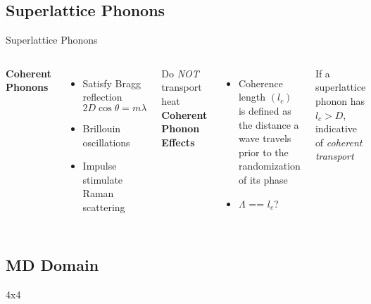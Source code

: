 \documentclass[xcolor=x11names,compress]{beamer}
\renewcommand{\(}{\begin{columns}}
\renewcommand{\)}{\end{columns}}
\newcommand{\<}[1]{\begin{column}{#1}}
\renewcommand{\>}{\end{column}}
\begin{document}
\subsection{Superlattice Phonons}
\begin{frame}{Superlattice Phonons}
\begin{columns}
\textbf{Coherent Phonons}
\begin{itemize}
\item Satisfy Bragg reflection
\begin{equation*}\label{EQ:Coh}
2D \cos \theta = m \lambda
\end{equation*}
\item Brillouin oscillations
\item Impulse stimulate Raman scattering
\end{itemize}
Do \textit{NOT} transport heat
\textbf{Coherent Phonon Effects}
\begin{itemize}
\item Coherence length $(l_c)$ is defined as the distance a wave travels prior to the randomization of its phase
\item $\Lambda$ == $l_c$?
\end{itemize}
If a superlattice phonon has $l_c>D$, indicative of \textit{coherent transport}
\end{columns}
\end{frame}

\subsection{MD Domain}
\begin{frame}{\small{4x4}}
\begin{figure}[!h]
\vspace*{-0.5cm}
\begin{center}
\renewcommand{\figure}{Fig.}
\end{center}
\end{figure}
\begin{figure}[!h]
\vspace*{-0.25cm}
\begin{center}
\label{fig:mixed}
\end{center}
\end{figure}
\end{frame}
\end{document}
